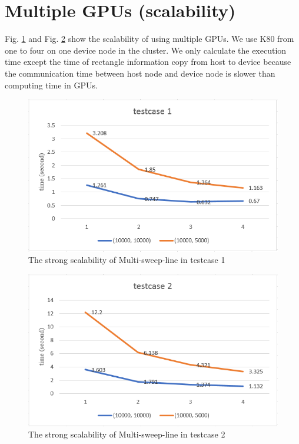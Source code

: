 \section{Multiple GPUs (scalability)}
Fig. \ref{fig:fig_5_5} and Fig. \ref{fig:fig_5_6} show the scalability of using multiple GPUs. We use K80 from one to four on one device node in the cluster. We only calculate the execution time except the time of rectangle information copy from host to device because the communication time between host node and device node is slower than computing time in GPUs.

\begin{figure}[h]
    \centering
    \includegraphics[scale=0.7]{image/fig_5_5}
    \caption{The strong scalability of Multi-sweep-line in testcase 1}
    \label{fig:fig_5_5}
\end{figure}

\begin{figure}[h]
    \centering
    \includegraphics[scale=0.7]{image/fig_5_6}
    \caption{The strong scalability of Multi-sweep-line in testcase 2}
    \label{fig:fig_5_6}
\end{figure}

